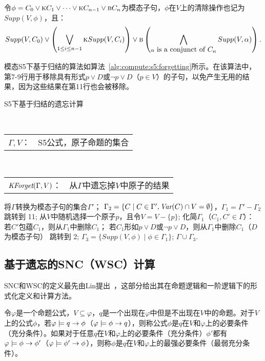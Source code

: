 令$\phi=C_0 \vee \textsc{k} C_1 \vee \dots \vee \textsc{k} C_{n-1} \vee \textsc{b} C_n$为模态子句，$\phi$在$V$上的清除操作也记为$Supp(V,\phi)$，且：
$$Supp(V, C_0) \vee \left(\bigvee_{1\leq i\leq n-1} \textsc{k} Supp(V, C_i)\right) \vee \textsc{b}\left(\bigwedge_{\alpha\hbox{ is a conjunct of $C_n$}} Supp(V, \alpha)\right).$$

模态S5下基于归结的算法如算法~\ref{alg:compute:s5:forgetting}所示。在该算法中，第7-9行用于移除具有形式$p\vee D$或$\neg p \vee D$（$p\in V$）的子句，以免产生无用的结果，因为这些结果在第11行也会被移除。


\begin{algorithm}[htbp]
	\small
	\caption{S5下基于归结的遗忘计算~\cite{feng2018strongest}}
	\label{alg:compute:s5:forgetting}
	\begin{algorithmic}[1]
		\REQUIRE ~~\\
		\begin{tabular}[t]{p{8mm}l}
			$\Gamma, V$：& S5公式，原子命题的集合
		\end{tabular}
		\ENSURE ~~\\
		\begin{tabular}[t]{p{8mm}l}
			$\textit{KForget}(\Gamma, V)$：  & \qquad \quad 从$\Gamma$中遗忘掉$V$中原子的结果
		\end{tabular}
		\STATE 将$\Gamma$转换为模态子句的集合$\Gamma'$；
		\STATE $\Gamma_2=\{C\mid C\in \Gamma', \textit{Var}(C) \cap V = \emptyset\}$，$\Gamma_1=\Gamma' - \Gamma_2$
		\STATE 跳转到 11;
		\ENDIF
		\STATE 从$V$中随机选择一个原子$p$，且令$V = V -\{p\}$;
		\STATE 化简$\Gamma_1$（$C_1, C'\in \Gamma$）：
		\STATE \qquad 若$C'$包蕴$C_1$，则从$\Gamma_1$中删除$C_1$；
		\STATE \qquad 若$C_1$形如$p\vee D$或$\neg p \vee D$，则从$\Gamma_1$中删除$C_1$（$D$为模态子句）
		\STATE 跳转到 2;
		\STATE $\Gamma_3=\{Supp(V, \phi) \mid \phi \in \Gamma_1\}$;
		\RETURN $\Gamma \cup \Gamma_3$.
	\end{algorithmic}
\end{algorithm}


\subsection{基于遗忘的SNC（WSC）计算}
SNC和WSC的定义最先由Lin提出~\cite{DBLP:journals/ai/Lin01}，这部分给出其在命题逻辑和一阶逻辑下的形式化定义和计算方法。

\begin{definition}
	令$\varphi$是一个命题公式，$V\subseteq \varphi$，$q$是一个出现在$\varphi$中但是不出现在$V$中的命题。对于$V$上的公式$\phi$，若$\varphi \models q \rightarrow \phi$（$\varphi \models \phi \rightarrow q$），则称公式$\phi$是$q$在$V$和$\varphi$上的必要条件（充分条件）。如果对于任意$q$在$V$和$\varphi$上的必要条件（充分条件）$\phi'$都有$\varphi \models \phi \rightarrow \phi'$（$\varphi \models \phi' \rightarrow \phi$），则称$\phi$是$q$在$V$和$\varphi$上的最强必要条件（最弱充分条件）。
\end{definition}

